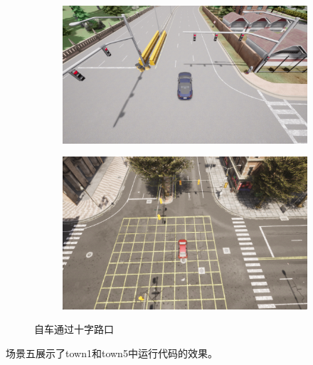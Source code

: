 \begin{figure}[H]
	\centering
	\begin{subfigure}[t]{0.48\textwidth}
		\centering
		\includegraphics[width=\textwidth, height=0.8\textwidth, keepaspectratio]{images/场景10.png}
		\caption{}
		\label{fig:scene10-1}
	\end{subfigure}
	\hfill %
	\begin{subfigure}[t]{0.48\textwidth}
		\centering
		\includegraphics[width=\textwidth, height=0.8\textwidth, keepaspectratio]{images/场景10.1.png}
		\caption{}
		\label{fig:scene10-2}
	\end{subfigure}
	\caption{自车通过十字路口}
	\label{fig:scene10}
\end{figure}
场景五展示了town1和town5中运行代码的效果。

